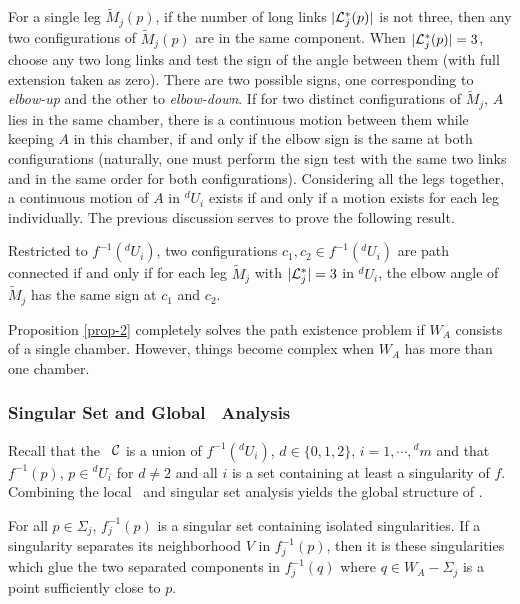 For a single leg $\tilde{M}_j(p)$, if the number of long links
$|{\cal L}_j^*(p)|$ is not three, then any two configurations of
$\tilde{M}_j(p)$ are in the same component. When $|{\cal
L}_j^*(p)|=3$, choose any two long links and test the sign of the
angle between them (with full extension taken as zero).  There are
two possible signs, one corresponding to {\sl elbow-up} and the
other to {\sl elbow-down}. If for two distinct configurations of
$\tilde{M}_j$, $A$ lies in the same chamber, there is a continuous
motion between them while keeping $A$ in this chamber, if and only
if the elbow sign is the same at both configurations (naturally,
one must perform the sign test with the same two links and in the
same order for both configurations). Considering all the legs
together, a continuous motion of $A$ in ${}^d\!U_i$ exists if and
only if a motion exists for each leg individually. The previous
discussion serves to prove the following result.

\medskip

\begin{Proposition}
\label{prop-2} \rm Restricted to $f^{-1}({}^d\!U_i)$, two
configurations $c_1,c_2 \in f^{-1}({}^d\!U_i)$ are path connected
if and only if for each leg $\tilde M_j$ with $|{\cal L}_j^*|=3$
in ${}^d\!U_i$, the elbow angle of $\tilde M_j$ has the same sign
at $c_1$ and $c_2$.
\end{Proposition}

\medskip

Proposition \ref{prop-2} completely solves the path existence
problem if $W_A$ consists of a single chamber. However, things
become complex when $W_A$ has more than one chamber.

\subsubsection{Singular Set and Global \cspace \ Analysis}

Recall that the \cspace \ ${\cal C}$ is a union of
$f^{-1}({}^d\!U_i)$, $d \in \{0,1,2\}$, $i=1,\cdots,{}^d\!m$ and
that $f^{-1}(p)$, $p\in {}^d\!U_i$ for $d\neq 2$ and all $i$ is a
set containing at least a singularity of $f$. Combining the local
\cspace \ and singular set analysis yields the global structure of
\cspace.

\medskip

\begin{Proposition}
\label{prop-sing} \rm For all $p \in \Sigma_j$, $f_j^{-1}(p)$ is a
singular set containing isolated singularities. If a singularity
separates its neighborhood $V$ in $f_j^{-1}(p)$, then it is these
singularities which glue the two separated components in
$f_j^{-1}(q)$ where $q \in W_A-\Sigma_j$ is a point sufficiently
close to $p$.
\end{Proposition}

